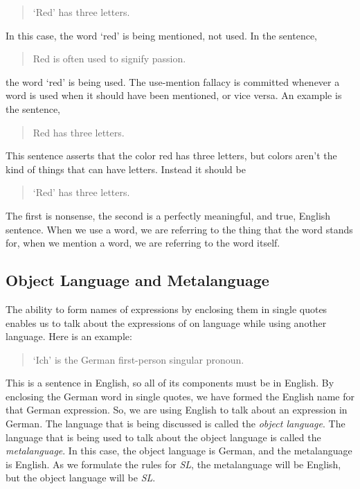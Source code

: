 \documentclass[../logic-text.tex]{subfiles}
\begin{document}
\begin{quote}
  \enquote*{Red} has three letters.
\end{quote}

\noindent In this case, the word \enquote*{red} is being mentioned, not used. In the sentence,

\begin{quote}
  Red is often used to signify passion.
\end{quote}

\noindent the word \enquote*{red} is being used. The use-mention fallacy is committed whenever a word is used when it should have been mentioned, or vice versa. An example is the sentence,

\begin{quote}
  Red has three letters.
\end{quote}

\noindent This sentence asserts that the color red has three letters, but colors aren't the kind of things that can have letters. Instead it should be

\begin{quote}
  \enquote*{Red} has three letters.
\end{quote}

\noindent The first is nonsense, the second is a perfectly meaningful, and true, English sentence. When we use a word, we are referring to the thing that the word stands for, when we mention a word, we are referring to the word itself.


\subsection{Object Language and Metalanguage}
\label{sec:object-lang-metal}

The ability to form names of expressions by enclosing them in single quotes enables us to talk about the expressions of on language while using another language. Here is an example:

\begin{quote}
  \enquote*{Ich} is the German first-person singular pronoun. 
\end{quote}

This is a sentence in English, so all of its components must be in English. By enclosing the German word in single quotes, we have formed the English name for that German expression. So, we are using English to talk about an expression in German. The language that is being discussed is called the \emph{object language}. The language that is being used to talk about the object language is called the \emph{metalanguage}. In this case, the object language is German, and the metalanguage is English. As we formulate the rules for \emph{SL}, the metalanguage will be English, but the object language will be \emph{SL}.
\end{document}
